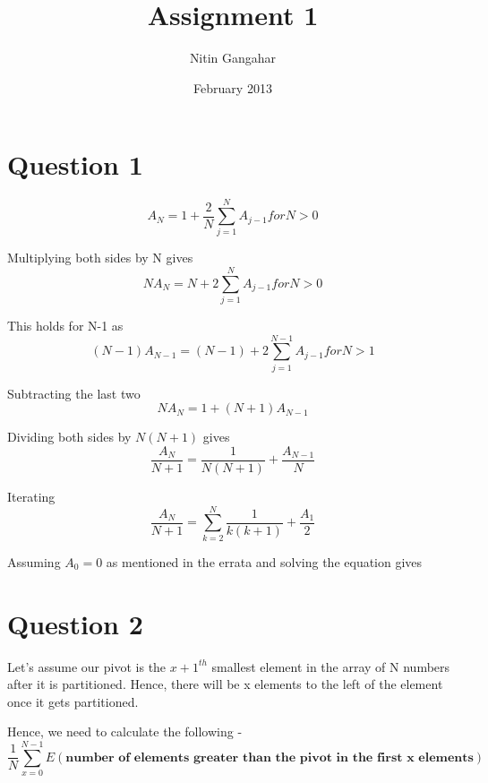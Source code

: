 \documentclass[a4paper,12pt]{article}
\begin{document}
\title{Assignment 1}
\author{Nitin Gangahar}
\date{February 2013}
\maketitle

\section*{Question 1}

\begin{equation}
	A_N = 1 + \frac{2}{N} \sum_{j=1}^{N} A_{j-1}  for N > 0
\end{equation}

Multiplying both sides by N gives
\begin{equation}
	NA_N = N + 2 \sum_{j=1}^{N} A_{j-1} for N > 0
\end{equation}

This holds for N-1 as
\begin{equation}
	(N-1)A_{N-1} = (N-1) + 2\sum_{j=1}^{N-1} A_{j-1} for N > 1 
\end{equation}

Subtracting the last two
\begin{equation}
	NA_N = 1 + (N+1)A_{N-1}
\end{equation}

Dividing both sides by $N(N+1)$ gives
\begin{equation}
	\frac{A_N}{N+1} = \frac{1}{N(N+1)} + \frac{A_{N-1}}{N}
\end{equation}

Iterating
\begin{equation}
	\frac{A_N}{N+1} = \sum_{k=2}^{N}\frac{1}{k(k+1)} + \frac{A_1}{2}
\end{equation}

Assuming $A_0 = 0$ as mentioned in the errata and solving the equation gives

\centerline{}

\newpage
\section*{Question 2}
Let's assume our pivot is the $x+1^{th}$ smallest element in the array of N numbers after it is partitioned. Hence, there will be x elements to the left of the element once it gets partitioned. 

Hence, we need to calculate the following - 
\begin{equation} \label{eq:q2main}
	\frac{1}{N} \sum_{x=0}^{N-1} E(\textbf{number of elements greater than the pivot in the first x elements}) 
\end{equation}
\end{document}
